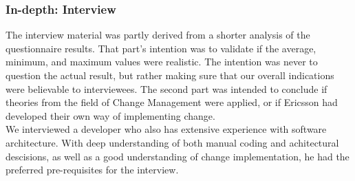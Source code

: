 \documentclass[final_report_innit.tex]{subfiles}
\begin{document}
\subsubsection{In-depth: Interview}\label{approachInInt}
The interview material was partly derived from a shorter analysis of the questionnaire results. That part's intention was to validate if the average, minimum, and maximum values were realistic. The intention was never to question the actual result, but rather making sure that our overall indications were believable to interviewees. The second part was intended to conclude if theories from the field of Change Management were applied, or if Ericsson had developed their own way of implementing change.
\\

We interviewed a developer who also has extensive experience with software architecture. With deep understanding of both manual coding and achitectural descisions, as well as a good understanding of change implementation, he had the preferred pre-requisites for the interview.
\end{document}
